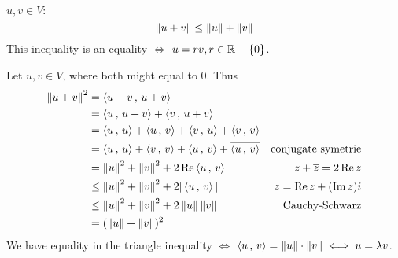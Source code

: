 \setcounter{thm}{16}
\begin{thm}
  $u,v \in V:$
  \begin{equation}
    \norm{u+v} \leq \norm{u} + \norm{v}
  \end{equation}
  This inequality is an equality $\iff$ $u=rv, r\in \real - \{0\}$.
\end{thm}
\begin{minipage}{\linewidth-30pt}
\begin{prf} Let $u,v \in V$, where both might equal to $0$. Thus
    \begin{equation}
      \begin{aligned}
        \norm{u+v}^2
        &=    \ip{u+v}{u+v} & \\
        &=    \ip{u}{u+v}+\ip{v}{u+v} & \\
        &=    \ip{u}{u}+\ip{u}{v}+\ip{v}{u}+\ip{v}{v} & \\
        &=    \ip{u}{u}+\ip{v}{v}+\ip{u}{v}+\overline{\ip{u}{v}} & \text{conjugate symetrie}\\
        &=    \norm{u}^2+\norm{v}^2+2\operatorname{Re} \ip{u}{v} & \text{$z+\overline{z} = 2\operatorname{Re} z$}\\
        &\leq \norm{u}^2+\norm{v}^2+2|\ip{u}{v}| & \text{$z=\realpart z + (\impart z) i$} \\
        &\leq \norm{u}^2+\norm{v}^2+2\norm{u}\norm{v} & \text{Cauchy-Schwarz} \\
        &=    (\norm{u} + \norm{v})^2 &
      \end{aligned}
    \end{equation}
We have equality in the triangle inequality $\iff$ $\ip{u}{v} = \norm{u}\cdot\norm{v} \iff u = \lambda v$.
\end{prf}
\end{minipage}

\phantom{.}
